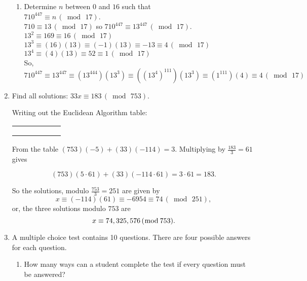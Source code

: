 \documentclass[11pt]{amsart}
\begin{document}
\begin{enumerate}
\begin{enumerate}
\item Determine $n$ between $0$ and $16$ such that\\
 $710^{447} \equiv n \,(\bmod\,17)$.\\[3pt]
 {\color{blue}
 $710 \equiv 13\, (\bmod\, 17)$ so $710^{447} \equiv 13^{447}\, (\bmod\, 17)$.\\
 $13^{2} \equiv 169 \equiv 16\,(\bmod\,17)$\\
 $13^{3} \equiv (16)(13) \equiv (-1)(13) \equiv -13 \equiv 4\, (\bmod\,17)$\\
 $13^{4} \equiv (4)(13) \equiv 52 \equiv 1\,(\bmod\,17)$\\
 
 So, $710^{447} \equiv 13^{447} \equiv (13^{444})(13^{3})
 \equiv ((13^{4})^{111})(13^{3}) \equiv (1^{111})(4)
\equiv 4\, (\bmod\,17)$\\[5pt]
} 
 
\end{enumerate}

\item Find all solutions: $33x\equiv 183\,(\bmod\,753 )$. \\[3pt]

{\color{blue}
Writing out the Euclidean Algorithm table:\\[5pt]

\begin{table}[!h]
\renewcommand{\arraystretch}{1.25}
\begin{tabular}{|*{6}{>{\raggedleft\arraybackslash}p{0.996cm}|}}
 \hline
 753&33&27&6&3&0 \\
 \hline
  &&22&7&4&2 \\
 \hline
 0&1&-22&23&-114&251 \\
 \hline
 1&0&1&-1&5&-11 \\
 \hline
\end{tabular}
\end{table}

From the table $(753)(-5)+ (33)(-114) = 3$. Multiplying by $\frac{183}{3} = 61$ gives

\[
(753)(5\cdot61) + (33)(-114\cdot 61) = 3\cdot 61 = 183.
\]

So the solutions, modulo $\frac{753}{3} = 251$ are given by 
\[
x\equiv (-114)(61) \equiv -6954 \equiv 74\, (\bmod\,251),
\]
or, the three solutions modulo $753$ are
\[
x\equiv 74, 325, 576\, (\bmod\,753).\\[5pt]
\]
}

\item  A multiple choice test contains 10 questions. There are four possible answers
for each question.\\[3pt]
\begin{enumerate}
\item How many ways can a student complete the test if every question 
must be answered?\\[3pt]


\end{enumerate}
\end{enumerate}
\end{document}
